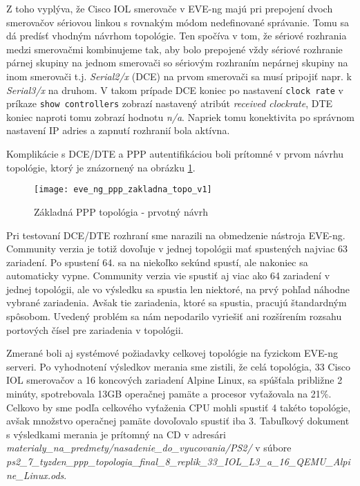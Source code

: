 Z toho vyplýva, že Cisco IOL smerovače v EVE-ng majú pri prepojení dvoch smerovačov sériovou linkou s rovnakým módom nedefinované správanie. Tomu sa dá predísť vhodným návrhom topológie. Ten spočíva v tom, že sériové rozhrania medzi smerovačmi kombinujeme tak, aby bolo prepojené vždy sériové rozhranie párnej skupiny na jednom smerovači so sériovým rozhraním nepárnej skupiny na inom smerovači t.j. \emph{Serial2/x} (DCE) na prvom smerovači sa musí pripojiť napr. k \emph{Serial3/x} na druhom. V takom prípade DCE koniec po nastavení \texttt{clock rate} v príkaze \texttt{show controllers} zobrazí nastavený atribút \emph{received clockrate}, DTE koniec naproti tomu zobrazí hodnotu \emph{n/a}. Napriek tomu konektivita po správnom nastavení IP adries a zapnutí rozhranií bola aktívna.

Komplikácie s DCE/DTE a PPP autentifikáciou boli prítomné v prvom návrhu topológie, ktorý je znázornený na obrázku \ref{obr:eve_ng_ppp_zakladna_topo_v1}.

\begin{figure}
    \centering
    \texttt{[image: eve\_ng\_ppp\_zakladna\_topo\_v1]}
    \caption{Základná PPP topológia - prvotný návrh}
    \label{obr:eve_ng_ppp_zakladna_topo_v1}
\end{figure}

Pri testovaní DCE/DTE rozhraní sme narazili na obmedzenie nástroja EVE-ng. Community verzia je totiž dovoľuje v jednej topológii mať spustených najviac 63 zariadení. Po spustení 64. sa na niekoľko sekúnd spustí, ale nakoniec sa automaticky vypne. Community verzia vie spustiť aj viac ako 64 zariadení v jednej topológii, ale vo výsledku sa spustia len niektoré, na prvý pohľad náhodne vybrané zariadenia. Avšak tie zariadenia, ktoré sa spustia, pracujú štandardným spôsobom. Uvedený problém sa nám nepodarilo vyriešiť ani rozšírením rozsahu portových čísel pre zariadenia v topológii.
  
Zmerané boli aj systémové požiadavky celkovej topológie na fyzickom EVE-ng serveri. Po vyhodnotení výsledkov merania sme zistili, že celá topológia, 33 Cisco IOL smerovačov a 16 koncových zariadení Alpine Linux, sa spúšťala približne 2 minúty, spotrebovala 13GB operačnej pamäte a procesor vyťažovala na 21\%. Celkovo by sme podľa celkového vyťaženia CPU mohli spustiť 4 takéto topológie, avšak množstvo operačnej pamäte dovoľovalo spustiť iba 3. Tabuľkový dokument s výsledkami merania je prítomný na CD v adresári \\ \emph{materialy\_na\_predmety/nasadenie\_do\_vyucovania/PS2/} v súbore \\ \emph{ps2\_7\_tyzden\_ppp\_topologia\_final\_8\_replik\_33\_IOL\_L3\_a\_16\_QEMU\_Alpine\_Linux.ods}.


